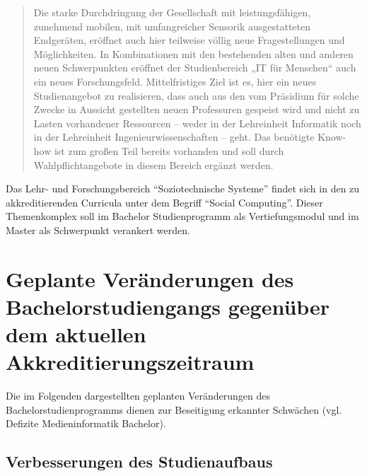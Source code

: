 \begin{quote}
Die starke Durchdringung der Gesellschaft mit leistungsfähigen,
zunehmend mobilen, mit umfangreicher Sensorik ausgestatteten Endgeräten,
eröffnet auch hier teilweise völlig neue Fragestellungen und
Möglichkeiten. In Kombinationen mit den bestehenden alten und anderen
neuen Schwerpunkten eröffnet der Studienbereich „IT für Menschen`` auch
ein neues Forschungsfeld. Mittelfristiges Ziel ist es, hier ein neues
Studienangebot zu realisieren, dass auch aus den vom Präsidium für
solche Zwecke in Aussicht gestellten neuen Professuren gespeist wird und
nicht zu Lasten vorhandener Ressourcen -- weder in der Lehreinheit
Informatik noch in der Lehreinheit Ingenieurwissenschaften -- geht. Das
benötigte Know-how ist zum großen Teil bereits vorhanden und soll durch
Wahlpflichtangebote in diesem Bereich ergänzt werden.
\end{quote}

Das Lehr- und Forschungsbereich ``Soziotechnische Systeme'' findet sich
in den zu akkreditierenden Curricula unter dem Begriff ``Social
Computing''. Dieser Themenkomplex soll im Bachelor Studienprogramm als
Vertiefungsmodul und im Master als Schwerpunkt verankert werden.

\section{Geplante Veränderungen des Bachelorstudiengangs gegenüber
dem aktuellen
Akkreditierungszeitraum}\label{geplante-veruxe4nderungen-des-bachelorstudiengangs-gegenuxfcber-dem-aktuellen-akkreditierungszeitraum}

Die im Folgenden dargestellten geplanten Veränderungen des
Bachelorstudienprogramms dienen zur Beseitigung erkannter Schwächen
(vgl. Defizite Medieninformatik Bachelor).

\subsection{Verbesserungen des
Studienaufbaus}\label{verbesserungen-des-studienaufbaus}

